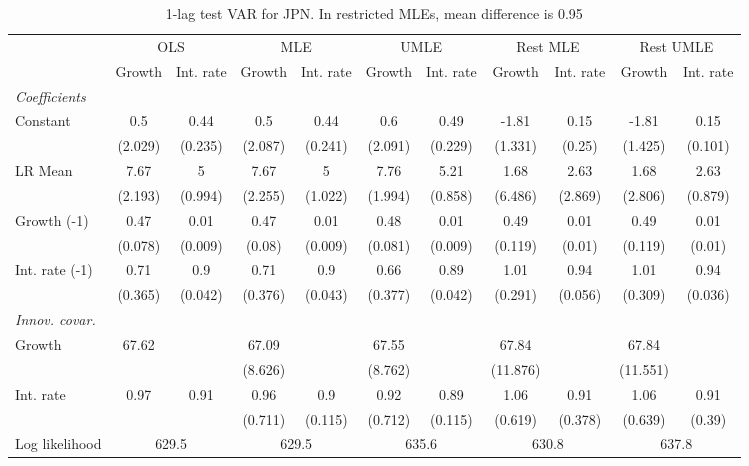 \begin{table}[htbp] 
	\centering
	\begin{tabular}{@{\extracolsep{4pt}}lcccccccccc@{}}		\hline\hline
		 		 & \multicolumn{2}{c}{OLS} &\multicolumn{2}{c}{MLE} &\multicolumn{2}{c}{UMLE} &\multicolumn{2}{c}{Rest MLE} &\multicolumn{2}{c}{Rest UMLE} \\ 
 		 & Growth 	 & Int. rate 	 & Growth 	 & Int. rate 	 & Growth 	 & Int. rate 	 & Growth 	 & Int. rate 	 & Growth 	 & Int. rate\\\cline{2-3}\cline{4-5}\cline{6-7}\cline{8-9}\cline{10-11}
\rule{0pt}{4ex} 
 \emph{Coefficients} 	  		 & 		 & 		 & 		 & 		 & 		 & 		 & 		 & 		 & 		 &\\ 
\quad Constant 	 & 0.5 	 & 0.44 	 & 0.5 	 & 0.44 	 & 0.6 	 & 0.49 	 & -1.81 	 & 0.15 	 & -1.81 	 & 0.15	 \\ 
 		 & (2.029) 	 & (0.235) 	 & (2.087) 	 & (0.241) 	 & (2.091) 	 & (0.229) 	 & (1.331) 	 & (0.25) 	 & (1.425) 	 & (0.101) 	 \\ 
\quad LR Mean 	 & 7.67 	 & 5 	 & 7.67 	 & 5 	 & 7.76 	 & 5.21 	 & 1.68 	 & 2.63 	 & 1.68 	 & 2.63	 \\ 
 		 & (2.193) 	 & (0.994) 	 & (2.255) 	 & (1.022) 	 & (1.994) 	 & (0.858) 	 & (6.486) 	 & (2.869) 	 & (2.806) 	 & (0.879) 	 \\ 
\quad Growth (-1) 	 &0.47 	 & 0.01 	 & 0.47 	 & 0.01 	 & 0.48 	 & 0.01 	 & 0.49 	 & 0.01 	 & 0.49 	 & 0.01	 \\ 
 		 & (0.078) 	 & (0.009) 	 & (0.08) 	 & (0.009) 	 & (0.081) 	 & (0.009) 	 & (0.119) 	 & (0.01) 	 & (0.119) 	 & (0.01) 	 \\ 
\quad Int. rate (-1) 	 &0.71 	 & 0.9 	 & 0.71 	 & 0.9 	 & 0.66 	 & 0.89 	 & 1.01 	 & 0.94 	 & 1.01 	 & 0.94	 \\ 
 		 & (0.365) 	 & (0.042) 	 & (0.376) 	 & (0.043) 	 & (0.377) 	 & (0.042) 	 & (0.291) 	 & (0.056) 	 & (0.309) 	 & (0.036) 	 \\ 
\rule{0pt}{4ex} \emph{Innov. covar.}  	 & 	 & 	 & 	 & 	 & 	 & 	 & 	 & 	 & 	 &\\ 
\quad Growth 	 &67.62 	 &  	 & 67.09 	 &  	 & 67.55 	 &  	 & 67.84 	 &  	 & 67.84 	 & 	 \\ 
 		 &  	 &  	 & (8.626) 	 &  	 & (8.762) 	 &  	 & (11.876) 	 &  	 & (11.551) 	 &  	 \\ 
\quad Int. rate 	 &0.97 	 & 0.91 	 & 0.96 	 & 0.9 	 & 0.92 	 & 0.89 	 & 1.06 	 & 0.91 	 & 1.06 	 & 0.91	 \\ 
 		 &  	 &  	 & (0.711) 	 & (0.115) 	 & (0.712) 	 & (0.115) 	 & (0.619) 	 & (0.378) 	 & (0.639) 	 & (0.39) 	 \\ 
 \hline \rule{0pt}{4ex} 
  Log likelihood 	 &\multicolumn{2}{c}{629.5} 	 & \multicolumn{2}{c}{629.5} 	 & \multicolumn{2}{c}{635.6} 	 & \multicolumn{2}{c}{630.8} 	 & \multicolumn{2}{c}{637.8}\\ 

 \hline 	\end{tabular}		\caption{1-lag test VAR for JPN. In restricted MLEs, mean difference is 0.95}
		\label{tab:JPN1}

\end{table}
